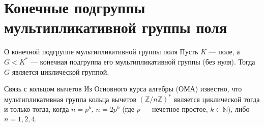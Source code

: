 
\section{Конечные подгруппы мультипликативной группы поля}


\begin{Theorem}{О конечной подгруппе мультипликативной группы поля}{}
	Пусть $K$ --- поле, а $G < K^*$ --- конечная подгруппа его мультипликативной группы (без нуля). Тогда $G$ является циклической группой.
\end{Theorem}

\begin{Remark}{Связь с кольцом вычетов}{}
	Из Основного курса алгебры (ОМА) известно, что мультипликативная группа кольца вычетов $(\mathbb{Z}/n\mathbb{Z})^*$ является циклической тогда и только тогда, когда $n = p^k$, $n = 2p^k$ (где $p$ --- нечетное простое, $k \in \mathbb{N}$), либо $n = 1, 2, 4$.
\end{Remark}

